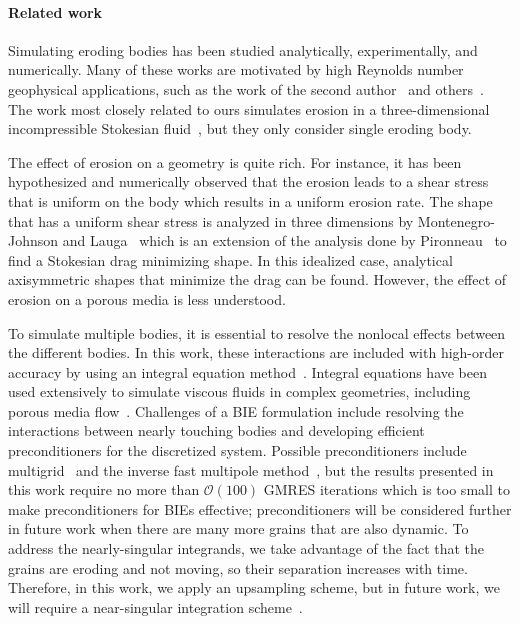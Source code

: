\documentclass[preprint, 10pt]{elsarticle}
\begin{document}
\paragraph{Related work} Simulating eroding bodies has been studied analytically, experimentally, and numerically.  Many of these works are motivated by high Reynolds number geophysical applications, such as the work of the second author~\cite{moo-ris-chi-zha-she2013, ris-moo-chi-she-zha2012, moore2017riemann} and others~\cite{par-izu2000, lag2000, coh-dev-sey-yi-szy-rot2015, han1969, Rothman2012, hewett2017evolution, ristroph2018sculpting, lopez2018cfd, lachaussee2018competitive, cohen2016erosion}.  The work most closely related to ours simulates erosion in a three-dimensional incompressible Stokesian fluid~\cite{mit-spa2016}, but they only consider single eroding body. 

The effect of erosion on a geometry is quite rich.  For instance, it has
been hypothesized and numerically observed that the erosion leads to a
shear stress that is uniform on the body which results in a uniform
erosion rate.  The shape that has a uniform shear stress is analyzed in
three dimensions by Montenegro-Johnson and Lauga~\cite{mon-lau2015}
which is an extension of the analysis done by Pironneau~\cite{pir1973}
to find a Stokesian drag minimizing shape.  In this idealized case,
analytical axisymmetric shapes that minimize the drag can be found.
However, the effect of erosion on a porous media is less understood.

To simulate multiple bodies, it is essential to resolve the nonlocal
effects between the different bodies.  In this work, these interactions
are included with high-order accuracy by using an integral equation
method~\cite{poz1992}.  Integral equations have been used extensively to
simulate viscous fluids in complex geometries, including porous media
flow~\cite{dea-qua-bir-jua2018, bar-mar-vee-zha2016}. Challenges of a
BIE formulation include resolving the interactions between nearly
touching bodies and developing efficient preconditioners for the
discretized system.  Possible preconditioners include
multigrid~\cite{qua-bir2015a} and the inverse fast multipole
method~\cite{qua-cou-dar2018}, but the results presented in this work
require no more than $\mathcal{O}(100)$ GMRES iterations which is too
small to make preconditioners for BIEs effective; preconditioners will
be considered further in future work when there are many more grains
that are also dynamic.  To address the nearly-singular integrands, we
take advantage of the fact that the grains are eroding and not moving,
so their separation increases with time.  Therefore, in this work, we
apply an upsampling scheme, but in future work, we will require a
near-singular integration scheme~\cite{qua-bir2014a,
klo-bar-gre-one2013, bar-wu-vee2015, hel-oja2008a, bea-lai2001}.
\end{document}
